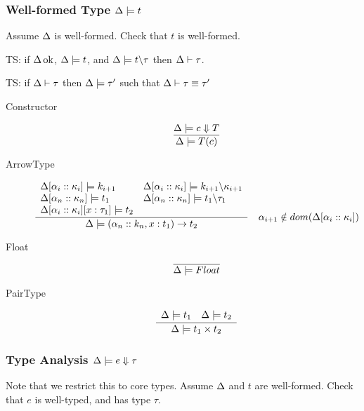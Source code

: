 \documentclass[12pt,twoside,fleqn]{amsart}
\theoremstyle{plain}
\theoremstyle{plain}
\theoremstyle{definition}
\begin{document}
\subsubsection{Well-formed Type \protect\( \Delta  \models t \protect \)}

Assume \( \Delta  \) is well-formed. Check that \( t \) is well-formed.

TS: if \( \Delta  \, \mathrm{ok} \), \( \Delta  \models t  \), and \( \Delta  \models t \backslash \tau  \)
then \( \Delta  \vdash \tau   \).

TS: if \( \Delta  \vdash \tau   \) then \( \Delta  \models \tau '  \) such that \( \Delta  \vdash \tau  \equiv \tau ' \)

\begin{description}
\item [Constructor]
\[
\frac{\Delta  \models c \Downarrow T}{\Delta  \models T(c) }\]

\item [ArrowType]
\[
\frac{\begin{array}{ll}
\Delta  [\alpha _{i}  ::\kappa _{i}  ] \models k_{i+1} & \Delta  [\alpha _{i}  ::\kappa _{i}  ] \models k_{i+1} \backslash \kappa _{i+1}\\
\Delta  [\alpha _{n}  ::\kappa _{n}  ] \models t_{1} & \Delta  [\alpha _{n}  ::\kappa _{n}  ] \models t_{1} \backslash \tau _{1}\\
\Delta  [\alpha _{i}  ::\kappa _{i}  ][x :\tau _{1} ] \models t_{2} & 
\end{array}}{\Delta  \models (\alpha _{n}::k_{n},x:t_{1})\rightarrow t_{2} }\quad \alpha _{i+1}\notin dom(\Delta [\alpha _{i}::\kappa _{i}])\]

\item [Float]
\[
\overline{\Delta  \models Float  }\]

\item [PairType]
\[
\frac{\begin{array}{ll}
\Delta  \models t_{1}  & \Delta  \models t_{2} 
\end{array}}{\Delta  \models t_{1}\times t_{2} }\]

\end{description}

\subsubsection{Type Analysis \protect\( \Delta  \models e \Downarrow \tau \protect \)}

Note that we restrict this to core types. Assume \( \Delta  \) and \( t \)
are well-formed. Check that \( e \) is well-typed, and has type \( \tau  \).
\end{document}
